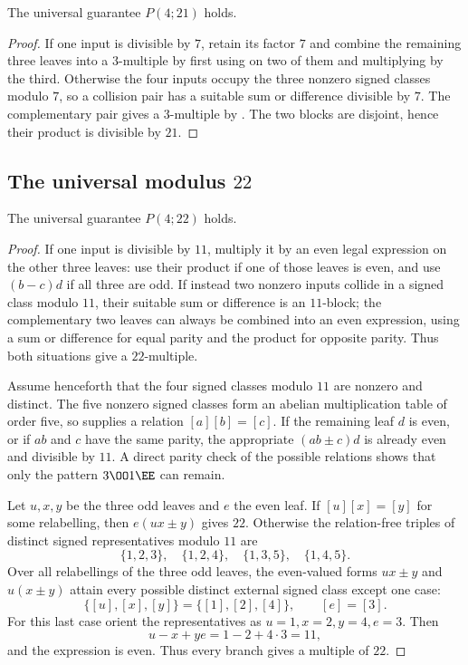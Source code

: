 \begin{theorem}\label{thm:p21}
The universal guarantee $P(4;21)$ holds.
\end{theorem}
\begin{proof}
If one input is divisible by $7$, retain its factor $7$ and combine the
remaining three leaves into a $3$-multiple by first using
 on two of them and multiplying by the third.  Otherwise the
four inputs occupy the three nonzero signed classes modulo $7$, so a
collision pair has a suitable sum or difference divisible by $7$.  The
complementary pair gives a $3$-multiple by .  The two blocks
are disjoint, hence their product is divisible by $21$.
\end{proof}

\subsection{\texorpdfstring{The universal modulus $22$}{The universal modulus 22}}\label{app:p22}

\begin{theorem}\label{thm:p22}
The universal guarantee $P(4;22)$ holds.
\end{theorem}
\begin{proof}
If one input is divisible by $11$, multiply it by an even legal expression on
the other three leaves: use their product if one of those leaves is even, and
use $(b-c)d$ if all three are odd.  If instead two nonzero inputs collide in
a signed class modulo $11$, their suitable sum or difference is an
$11$-block; the complementary two leaves can always be combined into an even
expression, using a sum or difference for equal parity and the product for
opposite parity.  Thus both situations give a $22$-multiple.

Assume henceforth that the four signed classes modulo $11$ are nonzero and
distinct.  The five nonzero signed classes form an abelian multiplication
table of order five, so  supplies a relation
$[a][b]=[c]$.  If the remaining leaf $d$ is even, or if $ab$ and $c$ have the
same parity, the appropriate $(ab\pm c)d$ is already even and divisible by
$11$.  A direct parity check of the possible relations shows that only the
pattern $3\OO1\EE$ can remain.

Let $u,x,y$ be the three odd leaves and $e$ the even leaf.  If
$[u][x]=[y]$ for some relabelling, then $e(ux\pm y)$ gives $22$.  Otherwise
the relation-free triples of distinct signed representatives modulo $11$ are
\[
 \{1,2,3\},\quad\{1,2,4\},\quad\{1,3,5\},\quad\{1,4,5\}.
\]
Over all relabellings of the three odd leaves, the even-valued forms
$ux\pm y$ and $u(x\pm y)$ attain every possible distinct external signed
class except one case:
\[
 \{[u],[x],[y]\}=\{[1],[2],[4]\},\qquad [e]=[3].
\]
For this last case orient the representatives as $u=1,x=2,y=4,e=3$.  Then
\[
 u-x+ye=1-2+4\cdot3=11,
\]
and the expression is even.  Thus every branch gives a multiple of $22$.
\end{proof}


